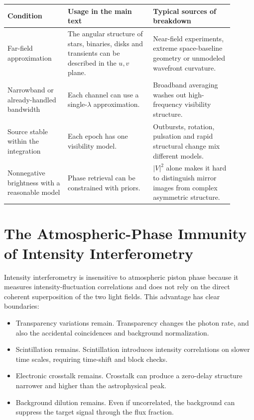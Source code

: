 \begin{longtable}{p{0.24\linewidth}p{0.34\linewidth}p{0.32\linewidth}}
\toprule
Condition & Usage in the main text & Typical sources of breakdown \\
\midrule
Far-field approximation & The angular structure of stars, binaries, disks and transients can be described in the \(u,v\) plane. & Near-field experiments, extreme space-baseline geometry or unmodeled wavefront curvature. \\
Narrowband or already-handled bandwidth & Each channel can use a single-\(\lambda\) approximation. & Broadband averaging washes out high-frequency visibility structure. \\
Source stable within the integration & Each epoch has one visibility model. & Outbursts, rotation, pulsation and rapid structural change mix different models. \\
Nonnegative brightness with a reasonable model & Phase retrieval can be constrained with priors. & \(|V|^2\) alone makes it hard to distinguish mirror images from complex asymmetric structure. \\
\bottomrule
\end{longtable}

\section{The Atmospheric-Phase Immunity of Intensity Interferometry}
\label{appsec:d-atmosphere}

Intensity interferometry is insensitive to atmospheric piston phase because it measures intensity-fluctuation correlations and does not rely on the direct coherent superposition of the two light fields. This advantage has clear boundaries:

\begin{itemize}[leftmargin=*]
\item Transparency variations remain. Transparency changes the photon rate, and also the accidental coincidences and background normalization.
\item Scintillation remains. Scintillation introduces intensity correlations on slower time scales, requiring time-shift and block checks.
\item Electronic crosstalk remains. Crosstalk can produce a zero-delay structure narrower and higher than the astrophysical peak.
\item Background dilution remains. Even if uncorrelated, the background can suppress the target signal through the flux fraction.
\end{itemize}

